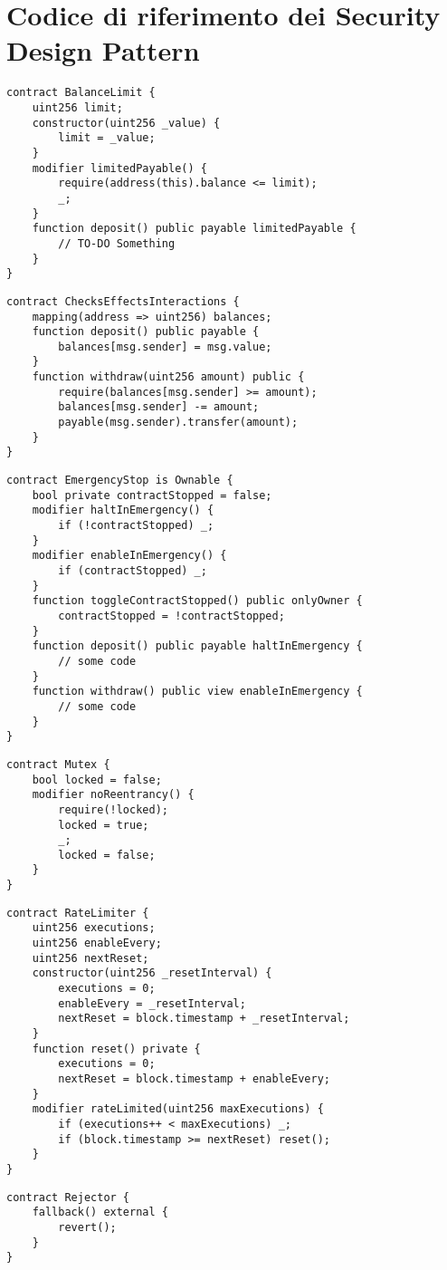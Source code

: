 {\section{Codice di riferimento dei Security Design Pattern}

{\label{appendix:balance_limit}\begin{lstlisting}[language=Solidity, caption={Codice di riferimento per Balance Limit}]
contract BalanceLimit {
	uint256 limit;
	constructor(uint256 _value) {
		limit = _value;
	}
	modifier limitedPayable() {
		require(address(this).balance <= limit);
		_;
	}
	function deposit() public payable limitedPayable {
		// TO-DO Something
	}
}
\end{lstlisting}}

{\label{appendix:check_effects_interactions}\begin{lstlisting}[language=Solidity, caption={Codice di riferimento per Check Effects Interactions}]
contract ChecksEffectsInteractions {
	mapping(address => uint256) balances;
	function deposit() public payable {
		balances[msg.sender] = msg.value;
	}
	function withdraw(uint256 amount) public {
		require(balances[msg.sender] >= amount);
		balances[msg.sender] -= amount;
		payable(msg.sender).transfer(amount);
	}
}
\end{lstlisting}}

\label{appendix:emergency_stop}{\begin{lstlisting}[language=Solidity, caption={Codice di riferimento per Emergency Stop}]
contract EmergencyStop is Ownable {
	bool private contractStopped = false;
	modifier haltInEmergency() {
		if (!contractStopped) _;
	}
	modifier enableInEmergency() {
		if (contractStopped) _;
	}
	function toggleContractStopped() public onlyOwner {
		contractStopped = !contractStopped;
	}
	function deposit() public payable haltInEmergency {
		// some code
	}
	function withdraw() public view enableInEmergency {
		// some code
	}
}
\end{lstlisting}}
\newpage
{\label{appendix:mutex}\begin{lstlisting}[language=Solidity, caption={Codice di riferimento per Mutex}]
contract Mutex {
	bool locked = false;
	modifier noReentrancy() {
		require(!locked);
		locked = true;
		_;
		locked = false;
	}
}
\end{lstlisting}}

{\label{appendix:rate_limit}\begin{lstlisting}[language=Solidity, caption={Codice di riferimento per Rate Limit}]
contract RateLimiter {
	uint256 executions;
	uint256 enableEvery;
	uint256 nextReset;
	constructor(uint256 _resetInterval) {
		executions = 0;
		enableEvery = _resetInterval;
		nextReset = block.timestamp + _resetInterval;
	}
	function reset() private {
		executions = 0;
		nextReset = block.timestamp + enableEvery;
	}
	modifier rateLimited(uint256 maxExecutions) {
		if (executions++ < maxExecutions) _;
		if (block.timestamp >= nextReset) reset();
	}
}
\end{lstlisting}}

{\label{appendix:rejector}\begin{lstlisting}[language=Solidity, caption={Codice di riferimento per Rejector}]
contract Rejector {
	fallback() external {
		revert();
	}
}
\end{lstlisting}}
}